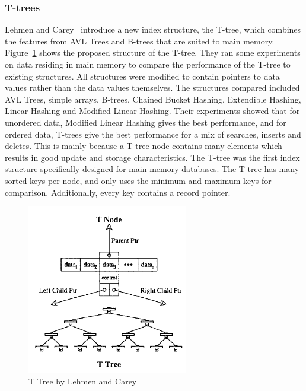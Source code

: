 \documentclass[12pt,a4paper]{article}
\begin{document}
\subsubsection*{T-trees}
Lehmen and Carey~\cite{lehman1986study} introduce a new index structure, the T-tree, which combines the features from AVL Trees and B-trees that are suited to
main memory. Figure~\ref{fig:ttree} shows the proposed structure of the T-tree. They ran some experiments on data residing in main memory to compare the
performance of the T-tree to existing structures. All structures were modified to contain pointers to data values rather than the data values themselves. The
structures compared included  AVL Trees, simple arrays, B-trees, Chained Bucket Hashing, Extendible Hashing, Linear Hashing and Modified Linear Hashing. Their
experiments showed that for unordered data, Modified Linear Hashing gives the best performance, and for ordered data, T-trees give the best performance for a
mix
of searches, inserts and deletes. This is mainly because a T-tree node contains many elements which results in good update and storage characteristics. The
T-tree
was the first index structure specifically designed for main memory databases. The T-tree has many sorted keys per node, and only uses the minimum and maximum
keys for comparison. Additionally, every key contains a record pointer.



\begin{figure}[!t]
\centering
\includegraphics[width=7cm]{figs/Ttree.png}
\caption{T Tree by Lehmen and Carey~\cite{lehman1986study}}
\label{fig:ttree}
\end{figure}
\end{document}
